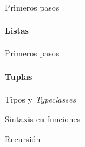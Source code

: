 \documentclass{beamer}
\begin{document}
\begin{frame}{Primeros pasos}      %
  \framesubtitle{Listas}

\end{frame}

\begin{frame}{Primeros pasos}      %
  \framesubtitle{Tuplas}

\end{frame}

\begin{frame}{Tipos y \emph{Typeclasses}}      %

\end{frame}

\begin{frame}{Sintaxis en funciones}      %

\end{frame}

\begin{frame}{Recursión}      %

\end{frame}
\end{document}
